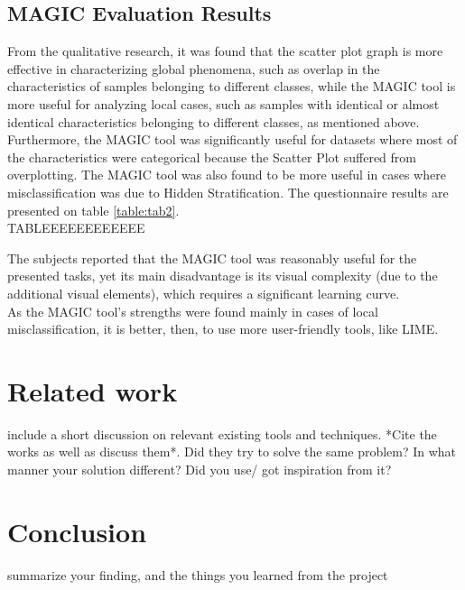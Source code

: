 \documentclass[12pt]{article}
\begin{document}
\subsection{MAGIC Evaluation Results}\label{MAGIC Evaluation Results}
From the qualitative research, it was found that the scatter plot graph is more effective in characterizing global phenomena, such as overlap in the characteristics of samples belonging to different classes, while the MAGIC tool is more useful for analyzing local cases, such as samples with identical or almost identical characteristics belonging to different classes, as mentioned above. Furthermore, the MAGIC tool was significantly useful for datasets where most of the characteristics were categorical because the Scatter Plot suffered from overplotting. The MAGIC tool was also found to be more useful in cases where misclassification was due to Hidden Stratification. The questionnaire results are presented on table \ref{table:tab2}.\\


TABLEEEEEEEEEEEE

The subjects reported that the MAGIC tool was reasonably useful for the presented tasks, yet its main disadvantage is its visual complexity (due to the additional visual elements), which requires a significant learning curve. \\
As the MAGIC tool's strengths were found mainly in cases of local misclassification, it is better, then, to use more user-friendly tools, like LIME.


\section{Related work}\label{Related work}
include a short discussion on relevant existing tools and
techniques. *Cite the works as well as discuss them*. Did they try to
solve the same problem? In what manner your solution different? Did
you use/ got inspiration from it? 

\section{Conclusion}\label{Conclusion}
summarize your finding, and the things you learned from
the project



\end{document}
